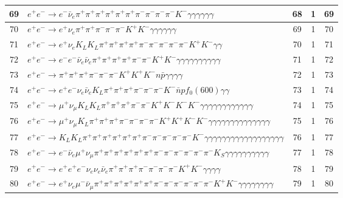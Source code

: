 \documentclass[landscape]{article}
\begin{document}
\begin{table}[htbp!]
\begin{tabular}{|c|>{\centering}p{18cm}|c|c|c|}
\hline
69 & $ e^{+} e^{-} \rightarrow e^{-} \bar{\nu}_{e} \pi^{+} \pi^{+} \pi^{+} \pi^{+} \pi^{+} \pi^{+} \pi^{-} \pi^{-} \pi^{-} \pi^{-} K^{-} \gamma \gamma \gamma \gamma \gamma \gamma $ & 68 & 1 & 69 \\
\hline
70 & $ e^{+} e^{-} \rightarrow e^{+} \nu_{e} \pi^{+} \pi^{+} \pi^{-} \pi^{-} \pi^{-} K^{+} K^{-} \gamma \gamma \gamma \gamma \gamma \gamma $ & 69 & 1 & 70 \\
\hline
71 & $ e^{+} e^{-} \rightarrow e^{+} \nu_{e} K_{L} K_{L} \pi^{+} \pi^{+} \pi^{+} \pi^{+} \pi^{-} \pi^{-} \pi^{-} \pi^{-} \pi^{-} K^{+} K^{-} \gamma \gamma $ & 70 & 1 & 71 \\
\hline
72 & $ e^{+} e^{-} \rightarrow e^{-} e^{-} \bar{\nu}_{e} \bar{\nu}_{e} \pi^{+} \pi^{+} \pi^{+} \pi^{+} \pi^{-} \pi^{-} K^{+} K^{-} \gamma \gamma \gamma \gamma \gamma \gamma \gamma \gamma \gamma \gamma $ & 71 & 1 & 72 \\
\hline
73 & $ e^{+} e^{-} \rightarrow \pi^{+} \pi^{+} \pi^{+} \pi^{-} \pi^{-} \pi^{-} K^{+} K^{+} K^{-} n \bar{p} \gamma \gamma \gamma \gamma $ & 72 & 1 & 73 \\
\hline
74 & $ e^{+} e^{-} \rightarrow e^{+} e^{-} \nu_{e} \bar{\nu}_{e} K_{L} \pi^{+} \pi^{+} \pi^{+} \pi^{-} \pi^{-} \pi^{-} K^{-} \bar{n} p f_{0}(600) \gamma \gamma $ & 73 & 1 & 74 \\
\hline
75 & $ e^{+} e^{-} \rightarrow \mu^{+} \nu_{\mu} K_{L} K_{L} \pi^{+} \pi^{+} \pi^{+} \pi^{-} \pi^{-} K^{+} K^{-} K^{-} K^{-} \gamma \gamma \gamma \gamma \gamma \gamma \gamma \gamma \gamma \gamma \gamma \gamma $ & 74 & 1 & 75 \\
\hline
76 & $ e^{+} e^{-} \rightarrow \mu^{+} \nu_{\mu} K_{L} \pi^{+} \pi^{+} \pi^{+} \pi^{-} \pi^{-} \pi^{-} \pi^{-} K^{+} K^{+} K^{-} K^{-} \gamma \gamma \gamma \gamma \gamma \gamma \gamma \gamma \gamma \gamma \gamma \gamma \gamma \gamma $ & 75 & 1 & 76 \\
\hline
77 & $ e^{+} e^{-} \rightarrow K_{L} K_{L} \pi^{+} \pi^{+} \pi^{+} \pi^{+} \pi^{+} \pi^{+} \pi^{-} \pi^{-} \pi^{-} \pi^{-} \pi^{-} K^{-} \gamma \gamma \gamma \gamma \gamma \gamma \gamma \gamma \gamma \gamma \gamma \gamma \gamma \gamma \gamma \gamma \gamma \gamma $ & 76 & 1 & 77 \\
\hline
78 & $ e^{+} e^{-} \rightarrow e^{-} \bar{\nu}_{e} \mu^{+} \nu_{\mu} \pi^{+} \pi^{+} \pi^{+} \pi^{+} \pi^{+} \pi^{+} \pi^{-} \pi^{-} \pi^{-} \pi^{-} \pi^{-} \pi^{-} K_{S} \gamma \gamma \gamma \gamma \gamma \gamma \gamma \gamma \gamma \gamma $ & 77 & 1 & 78 \\
\hline
79 & $ e^{+} e^{-} \rightarrow e^{+} e^{+} e^{-} \nu_{e} \nu_{e} \bar{\nu}_{e} \pi^{+} \pi^{+} \pi^{+} \pi^{-} \pi^{-} \pi^{-} \pi^{-} K^{+} K^{-} \gamma \gamma \gamma \gamma $ & 78 & 1 & 79 \\
\hline
80 & $ e^{+} e^{-} \rightarrow e^{+} \nu_{e} \mu^{-} \bar{\nu}_{\mu} \pi^{+} \pi^{+} \pi^{+} \pi^{+} \pi^{+} \pi^{+} \pi^{-} \pi^{-} \pi^{-} \pi^{-} \pi^{-} \pi^{-} K^{+} K^{-} \gamma \gamma \gamma \gamma \gamma \gamma \gamma \gamma $ & 79 & 1 & 80 \\
\hline
\end{tabular}
\end{table}
\end{document}
